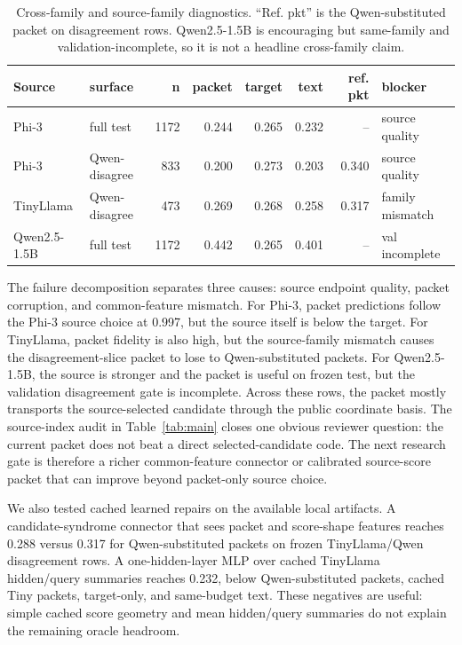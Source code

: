 \documentclass{article}
\begin{document}
\begin{table}[t]
  \centering
  \small
  \setlength{\tabcolsep}{3.4pt}
  \begin{tabular}{llrrrrrl}
    \toprule
    Source & surface & n & packet & target & text & ref. pkt & blocker \\
    \midrule
    Phi-3 & full test & 1172 & 0.244 & 0.265 & 0.232 & -- & source quality \\
    Phi-3 & Qwen-disagree & 833 & 0.200 & 0.273 & 0.203 & 0.340 & source quality \\
    TinyLlama & Qwen-disagree & 473 & 0.269 & 0.268 & 0.258 & 0.317 & family mismatch \\
    Qwen2.5-1.5B & full test & 1172 & 0.442 & 0.265 & 0.401 & -- & val incomplete \\
    \bottomrule
  \end{tabular}
  \caption{Cross-family and source-family diagnostics. ``Ref. pkt'' is the Qwen-substituted packet on disagreement rows. Qwen2.5-1.5B is encouraging but same-family and validation-incomplete, so it is not a headline cross-family claim.}
  \label{tab:falsification}
\end{table}

The failure decomposition separates three causes: source endpoint quality, packet corruption, and common-feature mismatch. For Phi-3, packet predictions follow the Phi-3 source choice at 0.997, but the source itself is below the target. For TinyLlama, packet fidelity is also high, but the source-family mismatch causes the disagreement-slice packet to lose to Qwen-substituted packets. For Qwen2.5-1.5B, the source is stronger and the packet is useful on frozen test, but the validation disagreement gate is incomplete. Across these rows, the packet mostly transports the source-selected candidate through the public coordinate basis. The source-index audit in Table~\ref{tab:main} closes one obvious reviewer question: the current packet does not beat a direct selected-candidate code. The next research gate is therefore a richer common-feature connector or calibrated source-score packet that can improve beyond packet-only source choice.

We also tested cached learned repairs on the available local artifacts. A candidate-syndrome connector that sees packet and score-shape features reaches 0.288 versus 0.317 for Qwen-substituted packets on frozen TinyLlama/Qwen disagreement rows. A one-hidden-layer MLP over cached TinyLlama hidden/query summaries reaches 0.232, below Qwen-substituted packets, cached Tiny packets, target-only, and same-budget text. These negatives are useful: simple cached score geometry and mean hidden/query summaries do not explain the remaining oracle headroom.
\end{document}
